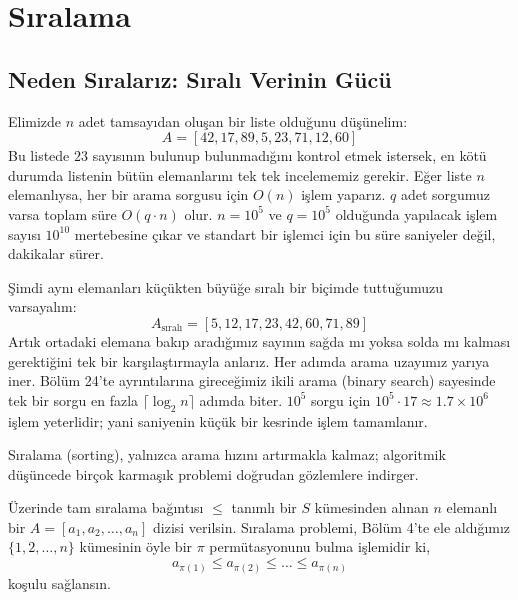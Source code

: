 \chapter[Sıralama · \textit{Temel}]{Sıralama}

\section{Neden Sıralarız: Sıralı Verinin Gücü}

Elimizde $n$ adet tamsayıdan oluşan bir liste olduğunu düşünelim:
\[
A = [42, 17, 89, 5, 23, 71, 12, 60]
\]
Bu listede $23$ sayısının bulunup bulunmadığını kontrol etmek istersek, en kötü durumda listenin bütün elemanlarını tek tek incelememiz gerekir. Eğer liste $n$ elemanlıysa, her bir arama sorgusu için $O(n)$ işlem yaparız. $q$ adet sorgumuz varsa toplam süre $O(q \cdot n)$ olur. $n = 10^5$ ve $q = 10^5$ olduğunda yapılacak işlem sayısı $10^{10}$ mertebesine çıkar ve standart bir işlemci için bu süre saniyeler değil, dakikalar sürer.

Şimdi aynı elemanları küçükten büyüğe sıralı bir biçimde tuttuğumuzu varsayalım:
\[
A_{\text{sıralı}} = [5, 12, 17, 23, 42, 60, 71, 89]
\]
Artık ortadaki elemana bakıp aradığımız sayının sağda mı yoksa solda mı kalması gerektiğini tek bir karşılaştırmayla anlarız. Her adımda arama uzayımız yarıya iner. Bölüm 24'te ayrıntılarına gireceğimiz ikili arama (binary search) sayesinde tek bir sorgu en fazla $\lceil \log_2 n \rceil$ adımda biter. $10^5$ sorgu için $10^5 \cdot 17 \approx 1.7 \times 10^6$ işlem yeterlidir; yani saniyenin küçük bir kesrinde işlem tamamlanır.

Sıralama (sorting), yalnızca arama hızını artırmakla kalmaz; algoritmik düşüncede birçok karmaşık problemi doğrudan gözlemlere indirger.

\begin{definition}
Üzerinde tam sıralama bağıntısı $\le$ tanımlı bir $S$ kümesinden alınan $n$ elemanlı bir $A = [a_1, a_2, \dots, a_n]$ dizisi verilsin. Sıralama problemi, Bölüm 4'te ele aldığımız $\{1, 2, \dots, n\}$ kümesinin öyle bir $\pi$ permütasyonunu bulma işlemidir ki,
\[
a_{\pi(1)} \le a_{\pi(2)} \le \dots \le a_{\pi(n)}
\]
koşulu sağlansın.
\end{definition}

